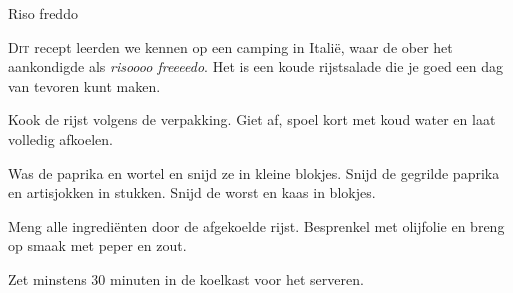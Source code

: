 \begin{recipe}{Riso freddo}


\lettrine{D}{it} recept leerden we kennen op een camping in Italië, waar de ober het
aankondigde als \textit{risoooo freeeedo}. Het is een koude rijstsalade die je goed
een dag van tevoren kunt maken.

\begin{ingredients}
\end{ingredients}

\begin{steps}
  \item Kook de rijst volgens de verpakking. Giet af, spoel kort met koud water en
        laat volledig afkoelen.
  \item Was de paprika en wortel en snijd ze in kleine blokjes. Snijd de gegrilde paprika en
        artisjokken in stukken. Snijd de worst en kaas in blokjes.
  \item Meng alle ingrediënten door de afgekoelde rijst. Besprenkel met olijfolie en
        breng op smaak met peper en zout.
  \item Zet minstens 30 minuten in de koelkast voor het serveren.
\end{steps}
\end{recipe}
